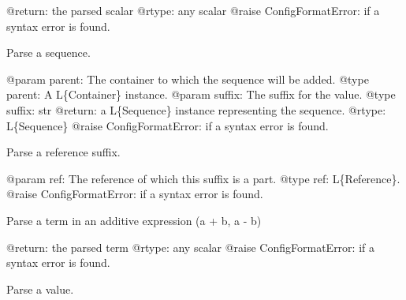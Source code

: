 \documentclass[a4paper,10pt,english]{sphinxmanual}
\begin{document}
\begin{fulllineitems}
\begin{fulllineitems}
@return: the parsed scalar
@rtype: any scalar
@raise ConfigFormatError: if a syntax error is found.

\end{fulllineitems}


\begin{fulllineitems}
\label{commands/apidoc/src:src.pyconf.ConfigReader.parseSequence}
Parse a sequence.

@param parent: The container to which the sequence will be added.
@type parent: A L\{Container\} instance.
@param suffix: The suffix for the value.
@type suffix: str
@return: a L\{Sequence\} instance representing the sequence.
@rtype: L\{Sequence\}
@raise ConfigFormatError: if a syntax error is found.

\end{fulllineitems}


\begin{fulllineitems}
\label{commands/apidoc/src:src.pyconf.ConfigReader.parseSuffix}
Parse a reference suffix.

@param ref: The reference of which this suffix is a part.
@type ref: L\{Reference\}.
@raise ConfigFormatError: if a syntax error is found.

\end{fulllineitems}


\begin{fulllineitems}
\label{commands/apidoc/src:src.pyconf.ConfigReader.parseTerm}
Parse a term in an additive expression (a + b, a - b)

@return: the parsed term
@rtype: any scalar
@raise ConfigFormatError: if a syntax error is found.

\end{fulllineitems}


\begin{fulllineitems}
\label{commands/apidoc/src:src.pyconf.ConfigReader.parseValue}
Parse a value.


\end{fulllineitems}
\end{fulllineitems}
\end{document}

